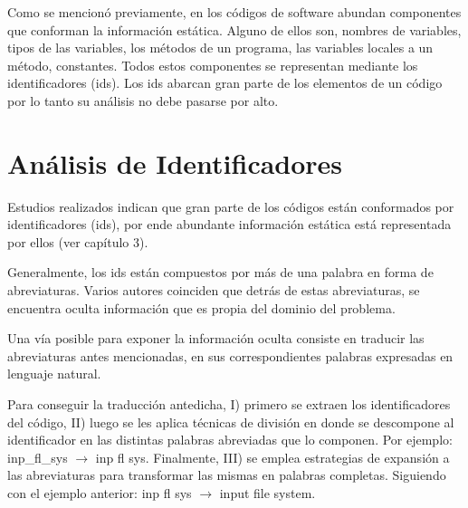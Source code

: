 \documentclass[a4paper,12pt]{report}
\begin{document}
Como se mencionó previamente, en los códigos de software abundan componentes que conforman la información estática. Alguno de ellos son, nombres de variables, tipos de las variables, los métodos de un programa, las variables locales a un método, constantes. Todos estos componentes se representan mediante los identificadores (ids). Los ids abarcan gran parte de los elementos de un código por lo tanto su análisis no debe pasarse por alto. 



\section{Análisis de Identificadores}

Estudios realizados \cite{DFPM05,DMDJ13,HDD06,FBL06} indican que gran parte de los códigos están conformados por identificadores (ids), por ende abundante información estática está representada por ellos (ver capítulo 3).

Generalmente, los ids están compuestos por más de una palabra en forma de abreviaturas. Varios autores coinciden \cite{BCPT99,LFBEX07,EZH08,EHPV09} que detrás de estas abreviaturas, se encuentra oculta información que es propia del dominio del problema.

Una vía posible para exponer la información oculta consiste en traducir las abreviaturas antes mencionadas, en sus correspondientes palabras expresadas en lenguaje natural.

Para conseguir la traducción antedicha, I) primero se extraen los identificadores del código, II) luego se les aplica técnicas de división en donde se descompone al identificador en las distintas palabras abreviadas que lo componen. Por ejemplo: \textsf{inp\_fl\_sys} $\rightarrow$ \textsf{inp fl sys}. Finalmente, III) se emplea estrategias de expansión a las abreviaturas para transformar las mismas en palabras completas. Siguiendo con el ejemplo anterior: \textsf{inp fl sys} $\rightarrow$ \textsf{input file system}.

\end{document}
